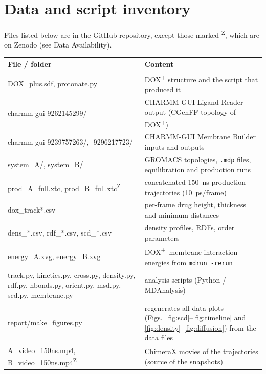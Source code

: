 \documentclass[11pt,a4paper]{article}
\newcommand{\dox}{DOX\textsuperscript{+}}
\begin{document}
\section{Data and script inventory}
\label{app:files}
Files listed below are in the GitHub repository, except those marked \textsuperscript{Z}, which are on
Zenodo (see Data Availability).
\begin{table}[!htbp]
\centering
\small
\begin{tabularx}{\linewidth}{@{}>{\raggedright\ttfamily}p{5.4cm}X@{}}
\toprule
\normalfont\textbf{File / folder} & \textbf{Content} \\
\midrule
DOX\_plus.sdf, protonate.py & \dox{} structure and the script that produced it \\
charmm-gui-9262145299/ & CHARMM-GUI Ligand Reader output (CGenFF topology of \dox) \\
charmm-gui-9239757263/, -9296217723/ & CHARMM-GUI Membrane Builder inputs and outputs \\
system\_A/, system\_B/ & GROMACS topologies, \texttt{.mdp} files, equilibration and production runs \\
prod\_A\_full.xtc, prod\_B\_full.xtc\textsuperscript{Z} & concatenated \SI{150}{ns} production trajectories (\SI{10}{ps}/frame) \\
dox\_track*.csv & per-frame drug height, thickness and minimum distances \\
dens\_*.csv, rdf\_*.csv, scd\_*.csv & density profiles, RDFs, order parameters \\
energy\_A.xvg, energy\_B.xvg & \dox--membrane interaction energies from \texttt{mdrun -rerun} \\
track.py, kinetics.py, cross.py, density.py, rdf.py, hbonds.py, orient.py, msd.py, scd.py, membrane.py & analysis scripts (Python / MDAnalysis) \\
report/make\_figures.py & regenerates all data plots (Figs.~\ref{fig:scd}--\ref{fig:timeline} and \ref{fig:density}--\ref{fig:diffusion}) from the data files \\
A\_video\_150ns.mp4, B\_video\_150ns.mp4\textsuperscript{Z} & ChimeraX movies of the trajectories (source of the snapshots) \\
\bottomrule
\end{tabularx}
\end{table}
\end{document}
